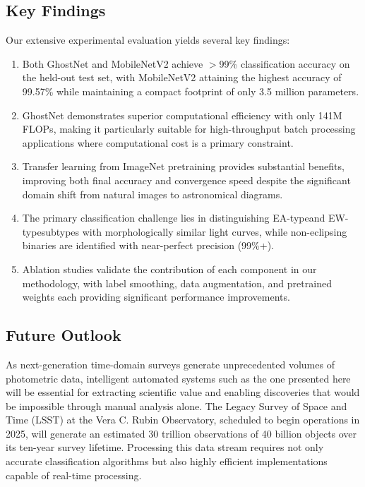 \documentclass[11pt,a4paper]{article}
\newcommand{\EA}{EA-type}
\newcommand{\EW}{EW-type}
\begin{document}
\subsection{Key Findings}

Our extensive experimental evaluation yields several key findings:

\begin{enumerate}
    \item Both GhostNet and MobileNetV2 achieve $>$99\% classification accuracy on the held-out test set, with MobileNetV2 attaining the highest accuracy of 99.57\% while maintaining a compact footprint of only 3.5 million parameters.
    
    \item GhostNet demonstrates superior computational efficiency with only 141M FLOPs, making it particularly suitable for high-throughput batch processing applications where computational cost is a primary constraint.
    
    \item Transfer learning from ImageNet pretraining provides substantial benefits, improving both final accuracy and convergence speed despite the significant domain shift from natural images to astronomical diagrams.
    
    \item The primary classification challenge lies in distinguishing \EA and \EW subtypes with morphologically similar light curves, while non-eclipsing binaries are identified with near-perfect precision (99\%+).
    
    \item Ablation studies validate the contribution of each component in our methodology, with label smoothing, data augmentation, and pretrained weights each providing significant performance improvements.
\end{enumerate}

\subsection{Future Outlook}

As next-generation time-domain surveys generate unprecedented volumes of photometric data, intelligent automated systems such as the one presented here will be essential for extracting scientific value and enabling discoveries that would be impossible through manual analysis alone. The Legacy Survey of Space and Time (LSST) at the Vera C. Rubin Observatory, scheduled to begin operations in 2025, will generate an estimated 30 trillion observations of 40 billion objects over its ten-year survey lifetime. Processing this data stream requires not only accurate classification algorithms but also highly efficient implementations capable of real-time processing.
\end{document}
